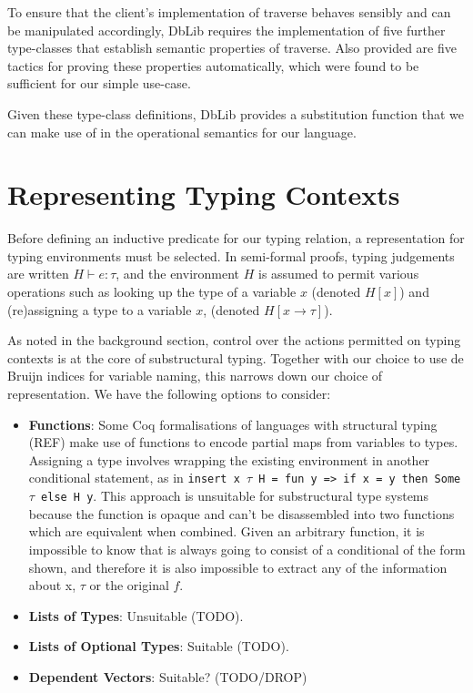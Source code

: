 \documentclass[]{unswthesis}
\let\c\texttt
\begin{document}
To ensure that the client's implementation of traverse behaves sensibly and can be manipulated accordingly, DbLib requires the implementation of five further type-classes that establish semantic properties of traverse. Also provided are five tactics for proving these properties automatically, which were found to be sufficient for our simple use-case.

Given these type-class definitions, DbLib provides a substitution function that we can make use of in the operational semantics for our language.

\section{Representing Typing Contexts}

Before defining an inductive predicate for our typing relation, a representation for typing environments must be selected. In semi-formal proofs, typing judgements are written $H \vdash e : \tau$, and the environment $H$ is assumed to permit various operations such as looking up the type of a variable $x$ (denoted $H[x]$) and (re)assigning a type to a variable $x$, (denoted $H[x \to \tau]$).

As noted in the background section, control over the actions permitted on typing contexts is at the core of substructural typing. Together with our choice to use de Bruijn indices for variable naming, this narrows down our choice of representation. We have the following options to consider:

\begin{itemize}
\item \textbf{Functions}: Some Coq formalisations of languages with structural typing (REF) make use of functions to encode partial maps from variables to types. Assigning a type involves wrapping the existing environment in another conditional statement, as in \c{insert x $\tau$ H = fun y => if x = y then Some $\tau$ else H y}. This approach is unsuitable for substructural type systems because the function is opaque and can't be disassembled into two functions which are equivalent when combined. Given an arbitrary function, it is impossible to know that is always going to consist of a conditional of the form shown, and therefore it is also impossible to extract any of the information about x, $\tau$ or the original $f$.
\item \textbf{Lists of Types}: Unsuitable (TODO).
\item \textbf{Lists of Optional Types}: Suitable (TODO).
\item \textbf{Dependent Vectors}: Suitable? (TODO/DROP)
\end{itemize} 
\end{document}
